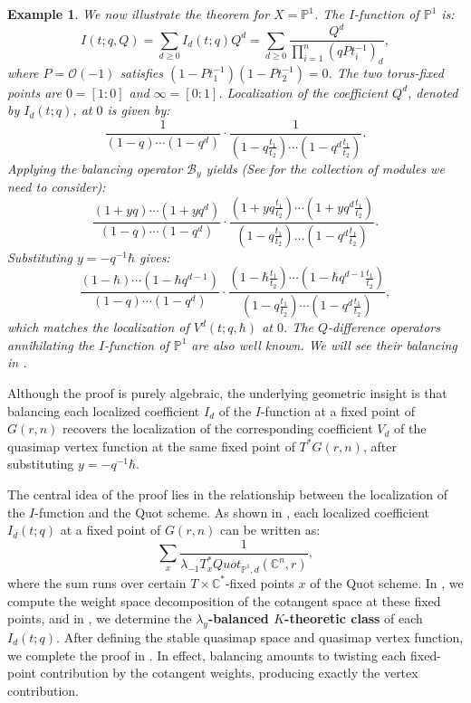 \documentclass{amsart}
\newtheorem{example}[thm]{Example}
\begin{document}
\begin{example}
    

 We now illustrate the theorem for $X = \mathbb{P}^{1}$. The $I$-function of $\mathbb{P}^{1}$ is:
 \[
 I(t;q,Q)=\sum_{d \geq 0}I_d(t;q)Q^d=\sum_{d \geq 0}\frac{Q^d}{\prod_{i=1}^n(qPt_i^{-1})_d},
 \]
 where $P = \mathcal{O}(-1)$ satisfies $(1-Pt_1^{-1})(1-Pt_2^{-1}) = 0$. The two torus-fixed points are $0 = [1:0]$ and $\infty = [0:1]$. Localization of the coefficient $Q^d$, denoted by $I_d(t;q)$, at $0$ is given by:
 \[
 \frac{1}{(1-q)\cdots(1-q^d)}\cdot\frac{1}{(1-q\frac{t_1}{t_2})\cdots(1-q^d\frac{t_1}{t_2})}.
 \]
Applying the balancing operator $\mathcal{B}_y$ yields (See  for the collection of modules we need to consider):
\[
\frac{(1+yq)\cdots(1+yq^d)}{(1-q)\cdots(1-q^d)}\cdot\frac{(1+yq\frac{t_1}{t_2})\cdots(1+yq^d\frac{t_1}{t_2})}{(1-q\frac{t_1}{t_2})\dots(1-q^d\frac{t_1}{t_2})}.
\]
 Substituting $y = -q^{-1}\hbar$ gives:
 \[
 \frac{(1-\hbar )\cdots(1-\hbar q^{d-1})}{(1-q)\cdots(1-q^d)}\cdot\frac{(1-\hbar \frac{t_1}{t_2})\cdots(1-\hbar q^{d-1}\frac{t_1}{t_2})}{(1-q\frac{t_1}{t_2})\cdots(1-q^d\frac{t_1}{t_2})},
 \]
 which matches the localization of $V^d(t;q,\hbar)$ at $0$. The $Q$-difference operators annihilating the $I$-function of $\mathbb{P}^1$ are also well known. We will see their balancing in .
 \end{example}
 Although the proof is purely algebraic, the underlying geometric insight is that
 balancing each localized coefficient $I_d$ of the $I$-function at a fixed point of $G(r,n)$ recovers the localization of the corresponding coefficient $V_d$ of the quasimap vertex function at the same fixed point of $T^*G(r,n)$, after substituting $y = -q^{-1}\hbar$.
 
 The central idea of the proof lies in the relationship between the localization of the $I$-function and the Quot scheme. As shown in , each localized coefficient $I_d(t;q)$ at a fixed point of $G(r,n)$ can be written as:
 \[
 \sum_x\frac{1}{\lambda_{-1}T^*_{x}Quot_{\mathbb{P}^1,d}(\mathbb{C}^n,r)},
 \]
 where the sum runs over certain $T \times \mathbb{C}^*$-fixed points $x$ of the Quot scheme. In , we compute the weight space decomposition of the cotangent space at these fixed points, and in , we determine the {\bf $\lambda_y$-balanced $K$-theoretic class} of each $I_d(t;q)$.  After defining the stable quasimap space and quasimap vertex function, we complete the proof in . In effect, balancing amounts to twisting each fixed-point contribution by the cotangent weights, producing exactly the vertex contribution.
\end{document}
